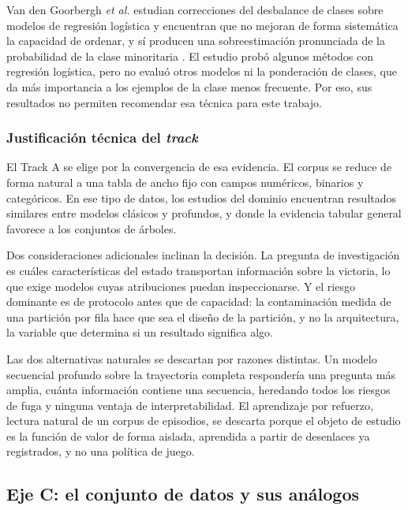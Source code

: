 Van den Goorbergh \textit{et al.} estudian correcciones del desbalance de
clases sobre modelos de regresión logística y encuentran que no mejoran de
forma sistemática la capacidad de ordenar, y sí producen una sobreestimación
pronunciada de la probabilidad de la clase minoritaria
\cite{vandenGoorbergh_imbalance_2022}. El estudio probó algunos métodos
con regresión logística, pero no evaluó otros modelos ni la ponderación de
clases, que da más importancia a los ejemplos de la clase menos frecuente.
Por eso, sus resultados no permiten recomendar esa técnica para este trabajo.

\subsubsection{Justificación técnica del \textit{track}}

El Track A se elige por la convergencia de esa evidencia.
El corpus se reduce de forma natural a una tabla de ancho fijo con campos
numéricos, binarios y categóricos. En ese tipo de datos, los estudios del
dominio encuentran resultados similares entre modelos clásicos y profundos, y
donde la evidencia tabular general favorece a los conjuntos de árboles.

Dos consideraciones adicionales inclinan la decisión. La pregunta de
investigación es cuáles características del estado transportan información
sobre la victoria, lo que exige modelos cuyas atribuciones puedan
inspeccionarse. Y el riesgo dominante es de protocolo antes que de
capacidad: la contaminación medida de una partición por fila hace que sea el
diseño de la partición, y no la arquitectura, la variable que determina si
un resultado significa algo.

Las dos alternativas naturales se descartan por razones distintas. Un modelo
secuencial profundo sobre la trayectoria completa respondería una pregunta
más amplia, cuánta información contiene una secuencia, heredando todos
los riesgos de fuga y ninguna ventaja de interpretabilidad. El aprendizaje
por refuerzo, lectura natural de un corpus de episodios, se descarta porque
el objeto de estudio es la función de valor de forma aislada, aprendida a
partir de desenlaces ya registrados, y no una política de juego.

% 
\subsection{Eje C: el conjunto de datos y sus análogos}
\label{subsec:ejec}

